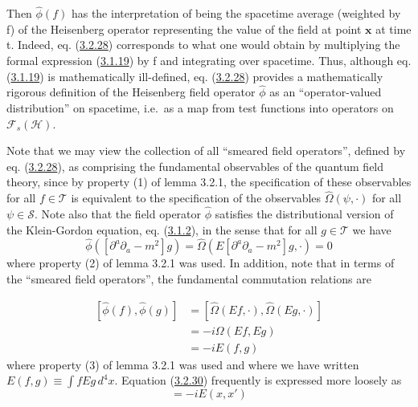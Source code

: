 \documentclass[11pt,a4paper]{article}
\begin{document}
Then \(\hat\phi(f)\) has the interpretation of being the spacetime average (weighted by f) of the Heisenberg operator representing the value of the field at point \(\mathbf{x}\) at time t. Indeed, eq. (\hyperref[eq:3.2.28]{3.2.28}) corresponds to what one would obtain by multiplying the formal expression (\hyperref[eq:3.1.19]{3.1.19}) by f and integrating over spacetime. Thus, although eq. (\hyperref[eq:3.1.19]{3.1.19}) is mathematically ill-defined, eq. (\hyperref[eq:3.2.28]{3.2.28}) provides a mathematically rigorous definition of the Heisenberg field operator \(\hat{\phi}\) as an ``operator-valued distribution'' on spacetime, i.e.~as a map from test functions into operators on \(\mathcal{F}_{s}(\mathcal{H})\).

Note that we may view the collection of all ``smeared field operators'', defined by eq. (\hyperref[eq:3.2.28]{3.2.28}), as comprising the fundamental observables of the quantum field theory, since by property (1) of lemma 3.2.1, the specification of these observables for all \(f \in \mathcal{T}\) is equivalent to the specification of the observables \(\hat{\Omega}(\psi,\cdot)\) for all \(\psi \in \mathcal{S}\). Note also that the field operator \(\hat{\phi}\) satisfies the distributional version of the Klein-Gordon equation, eq. (\hyperref[eq:3.1.2]{3.1.2}), in the sense that for all \(g \in \mathcal{T}\) we have
\begin{equation*}
\hat{\phi} ([\partial^a \partial_a - m^2]g) = \hat{\Omega}(E[\partial^a \partial_a - m^2]g, \cdot) = 0 \tag{3.2.29}\label{eq:3.2.29}
\end{equation*}
where property (2) of lemma 3.2.1 was used. In addition, note that in terms of the ``smeared field operators'', the fundamental commutation relations are

\hypertarget{source-59}{}
\begin{equation*}
\begin{aligned} [\hat{\phi}(f), \hat{\phi}(g)] &= [\hat{\Omega}(Ef, \cdot), \hat{\Omega}(Eg, \cdot)] \\ &= -i\Omega (Ef, Eg) \\ &= -iE(f, g) \end{aligned} \tag{3.2.30}\label{eq:3.2.30}
\end{equation*}
where property (3) of lemma 3.2.1 was used and where we have written \(E(f,g) \equiv \int fEg \,d^4x\). Equation (\hyperref[eq:3.2.30]{3.2.30}) frequently is expressed more loosely as
\begin{equation*}
[\hat{\phi}(x), \hat{\phi}(x')] = -iE(x,x') \tag{3.2.31}\label{eq:3.2.31}
\end{equation*}
\end{document}
